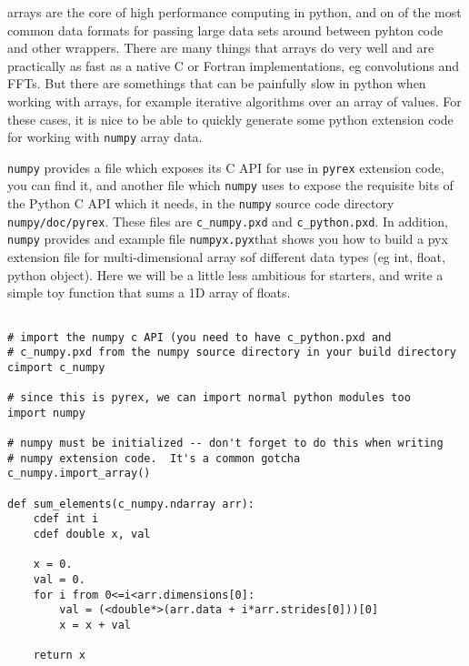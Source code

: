  arrays are the core of high performance computing in
python, and on of the most common data formats for passing large data
sets around between pyhton code and other wrappers.  There are many
things that arrays do very well and are practically as fast as a
native C or Fortran implementations, eg convolutions and FFTs.  But
there are somethings that can be painfully slow in python when working
with arrays, for example iterative algorithms over an array of values.
For these cases, it is nice to be able to quickly generate some python
extension code for working with \texttt{numpy} array data.

\texttt{numpy} provides a file which exposes its C API for use in
\texttt{pyrex} extension code, you can find it, and another file which
\texttt{numpy} uses to expose the requisite bits of the Python C API
which it needs, in the \texttt{numpy} source code directory
\texttt{numpy/doc/pyrex}.  These files are \texttt{c_numpy.pxd} and
\texttt{c_python.pxd}.  In addition, \texttt{numpy} provides and
example file \texttt{numpyx.pyx}that shows you how to build a pyx
extension file for multi-dimensional array sof different data types
(eg int, float, python object).  Here we will be a little less
ambitious for starters, and write a simple toy function that sums a 1D
array of floats.

\begin{lstlisting}

# import the numpy c API (you need to have c_python.pxd and
# c_numpy.pxd from the numpy source directory in your build directory
cimport c_numpy

# since this is pyrex, we can import normal python modules too
import numpy

# numpy must be initialized -- don't forget to do this when writing
# numpy extension code.  It's a common gotcha
c_numpy.import_array()

def sum_elements(c_numpy.ndarray arr):
    cdef int i
    cdef double x, val

    x = 0.
    val = 0.
    for i from 0<=i<arr.dimensions[0]:
        val = (<double*>(arr.data + i*arr.strides[0]))[0]
        x = x + val

    return x

\end{lstlisting}

